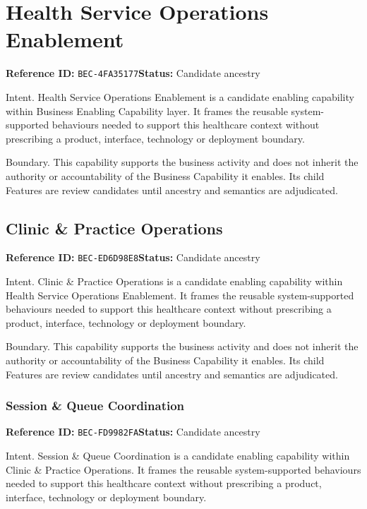 \documentclass[11pt,a4paper,openany]{book}
\begin{document}
\chapter{Health Service Operations Enablement}\label{cap:bec-4fa35177}
\noindent\textbf{Reference ID:} \texttt{BEC-4FA35177}\quad \textbf{Status:} Candidate ancestry\par
Intent. Health Service Operations Enablement is a candidate enabling capability within Business Enabling Capability layer. It frames the reusable system-supported behaviours needed to support this healthcare context without prescribing a product, interface, technology or deployment boundary.

Boundary. This capability supports the business activity and does not inherit the authority or accountability of the Business Capability it enables. Its child Features are review candidates until ancestry and semantics are adjudicated.

\section{Clinic \& Practice Operations}\label{cap:bec-ed6d98e8}
\noindent\textbf{Reference ID:} \texttt{BEC-ED6D98E8}\quad \textbf{Status:} Candidate ancestry\par
Intent. Clinic \& Practice Operations is a candidate enabling capability within Health Service Operations Enablement. It frames the reusable system-supported behaviours needed to support this healthcare context without prescribing a product, interface, technology or deployment boundary.

Boundary. This capability supports the business activity and does not inherit the authority or accountability of the Business Capability it enables. Its child Features are review candidates until ancestry and semantics are adjudicated.

\subsection{Session \& Queue Coordination}\label{cap:bec-fd9982fa}
\noindent\textbf{Reference ID:} \texttt{BEC-FD9982FA}\quad \textbf{Status:} Candidate ancestry\par
Intent. Session \& Queue Coordination is a candidate enabling capability within Clinic \& Practice Operations. It frames the reusable system-supported behaviours needed to support this healthcare context without prescribing a product, interface, technology or deployment boundary.
\end{document}
